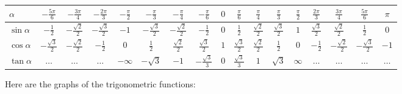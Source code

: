     \begin{center}
  \begin{tabular}{| l | c | c | c | c | c | c | c | c | c | c | c | c | c | c | c | c |}
    \hline
    $\alpha$ &
    $-\frac{5\pi}{6}$ &
    $-\frac{3\pi}{4}$ &
    $-\frac{2\pi}{3}$ &
    $-\frac{\pi}{2}$ &
    $-\frac{\pi}{3}$ &
    $-\frac{\pi}{4}$ &
    $-\frac{\pi}{6}$ &
    $0$ &
    $\frac{\pi}{6}$ &
    $\frac{\pi}{4}$ &
    $\frac{\pi}{3}$ &
    $\frac{\pi}{2}$ &
    $\frac{2\pi}{3}$ &
    $\frac{3\pi}{4}$ &
    $\frac{5\pi}{6}$ &
    $\pi$ \\
    \hline
    $\sin \alpha$ &
    $-\frac{1}{2}$ &
    $-\frac{\sqrt{2}}{2}$ &
    $-\frac{\sqrt{3}}{2}$ &
    $-1$ &
    $-\frac{\sqrt{3}}{2}$ &
    $-\frac{\sqrt{2}}{2}$ &
    $-\frac{1}{2}$ &
    $0$ &
    $\frac{1}{2}$ &
    $\frac{\sqrt{2}}{2}$ &
    $\frac{\sqrt{3}}{2}$ &
    $1$ &
    $\frac{\sqrt{3}}{2}$ &
    $\frac{\sqrt{2}}{2}$ &
    $\frac{1}{2}$ &
    $0$
    \\
    \hline
    $\cos \alpha$ &
    $-\frac{\sqrt{3}}{2}$ &
    $-\frac{\sqrt{2}}{2}$ &
    $-\frac{1}{2}$ &
    $0$ &
    $\frac{1}{2}$ &
    $\frac{\sqrt{2}}{2}$ &
    $\frac{\sqrt{3}}{2}$ &
    $1$ &
    $\frac{\sqrt{3}}{2}$ &
    $\frac{\sqrt{2}}{2}$ &
    $\frac{1}{2}$ &
    $0$ &
    $-\frac{1}{2}$ &
    $-\frac{\sqrt{2}}{2}$ &
    $-\frac{\sqrt{3}}{2}$ &
    $-1$
    \\
    \hline
    $\tan \alpha$ &
    $\dots$ &
    $\dots$ &
    $\dots$ &
    $-\infty$ &
    $-\sqrt{3}$ &
    $-1$ &
    $-\frac{\sqrt{3}}{3}$ &
    $0$ &
    $\frac{\sqrt{3}}{3}$ &
    $1$ &
    $\sqrt{3}$ &
    $\infty$ &
    $\dots$ &
    $\dots$ &
    $\dots$ &
    $\dots$
    \\
    \hline
  \end{tabular}
  \end{center}

Here are the graphs of the trigonometric functions:

